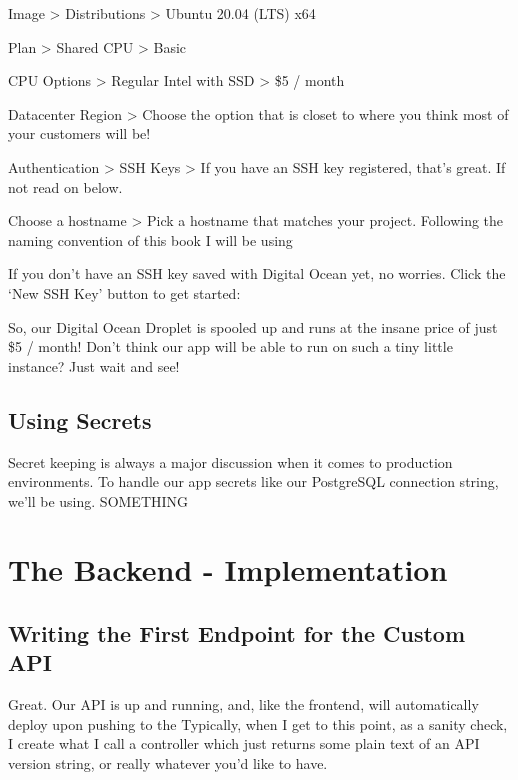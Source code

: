 \documentclass[paper=6in:9in,pagesize=pdftex,headinclude=on,footinclude=on,12pt]{scrbook}
\begin{document}
\begin{arrows}
\item Image > Distributions > Ubuntu 20.04 (LTS) x64
\item Plan > Shared CPU > Basic
\item CPU Options > Regular Intel with SSD > \$5 / month
\item Datacenter Region > Choose the option that is closet to where you think most of your customers will be!
\item Authentication > SSH Keys > If you have an SSH key registered, that's great. If not read on below.
\item Choose a hostname > Pick a hostname that matches your project. Following the naming convention of this book I will be using 
\end{arrows}


If you don't have an SSH key saved with Digital Ocean yet, no worries. Click the `New SSH Key' button to get started:

So, our Digital Ocean Droplet is spooled up and runs at the insane price of just \$5 / month! Don't think our app will be able to run on such a tiny little instance? Just wait and see!

\section{Using Secrets}

Secret keeping is always a major discussion when it comes to production environments. To handle our app secrets like our PostgreSQL connection string, we'll be using. SOMETHING

\chapter{The Backend - Implementation}

\section{Writing the First Endpoint for the Custom API}

Great. Our API is up and running, and, like the frontend, will automatically deploy upon pushing to the  Typically, when I get to this point, as a sanity check, I create what I call a  controller which just returns some plain text of an API version string, or really whatever you'd like to have.
\end{document}
